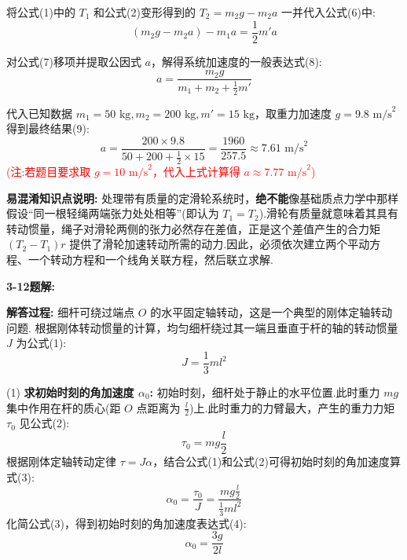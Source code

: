 将公式(1)中的 $T_1$ 和公式(2)变形得到的 $T_2 = m_2 g - m_2 a$ 一并代入公式(6)中:
\begin{equation}
	(m_2 g - m_2 a) - m_1 a = \frac{1}{2}m'a
\end{equation}

对公式(7)移项并提取公因式 $a$，解得系统加速度的一般表达式(8):
\begin{equation}
	a = \frac{m_2 g}{m_1 + m_2 + \frac{1}{2}m'}
\end{equation}

代入已知数据 $m_1 = 50\text{ kg}, m_2 = 200\text{ kg}, m' = 15\text{ kg}$，取重力加速度 $g = 9.8\text{ m/s}^2$ 得到最终结果(9):
\begin{equation}
	a = \frac{200 \times 9.8}{50 + 200 + \frac{1}{2} \times 15} = \frac{1960}{257.5} \approx 7.61 \text{ m/s}^2
\end{equation}
\textcolor{red}{(注:若题目要求取 $g = 10\text{ m/s}^2$，代入上式计算得 $a \approx 7.77\text{ m/s}^2$)}

\vspace{1em}

\textbf{易混淆知识点说明:}
处理带有质量的定滑轮系统时，\textbf{绝不能}像基础质点力学中那样假设“同一根轻绳两端张力处处相等”(即认为 $T_1 = T_2$).滑轮有质量就意味着其具有转动惯量，绳子对滑轮两侧的张力必然存在差值，正是这个差值产生的合力矩 $(T_2 - T_1)r$ 提供了滑轮加速转动所需的动力.因此，必须依次建立两个平动方程、一个转动方程和一个线角关联方程，然后联立求解.

\vspace{2em}

\textbf{3-12题解:}


\textbf{解答过程:}
细杆可绕过端点 $O$ 的水平固定轴转动，这是一个典型的刚体定轴转动问题.
根据刚体转动惯量的计算，均匀细杆绕过其一端且垂直于杆的轴的转动惯量 $J$ 为公式(1):
\begin{equation}
	J = \frac{1}{3}ml^2
\end{equation}

(1) \textbf{求初始时刻的角加速度 $\alpha_0$:}
初始时刻，细杆处于静止的水平位置.此时重力 $mg$ 集中作用在杆的质心(距 $O$ 点距离为 $\frac{l}{2}$)上.此时重力的力臂最大，产生的重力力矩 $\tau_0$ 见公式(2):
\begin{equation}
	\tau_0 = mg \frac{l}{2}
\end{equation}
根据刚体定轴转动定律 $\tau = J\alpha$，结合公式(1)和公式(2)可得初始时刻的角加速度算式(3):
\begin{equation}
	\alpha_0 = \frac{\tau_0}{J} = \frac{mg \frac{l}{2}}{\frac{1}{3}ml^2}
\end{equation}
化简公式(3)，得到初始时刻的角加速度表达式(4):
\begin{equation}
	\alpha_0 = \frac{3g}{2l}
\end{equation}

